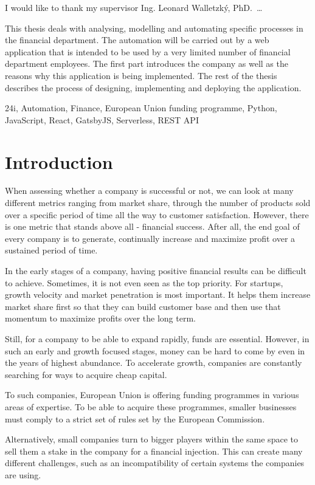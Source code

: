 \documentclass[12pt,oneside]{fithesis2}
\begin{document}
  \FrontMatter
    \ThesisTitlePage
    \begin{ThesisDeclaration}
      \DeclarationText
      \AdvisorName
    \end{ThesisDeclaration}
    \begin{ThesisThanks}
      I would like to thank my supervisor Ing. Leonard Walletzký, PhD. \,\dots
    \end{ThesisThanks}
    \begin{ThesisAbstract}
      This thesis deals with analysing, modelling and automating specific processes in the financial department. The automation will be carried out by a web application that is intended to be used by a very limited number of financial department employees. The first part introduces the company as well as the reasons why this application is being implemented. The rest of the thesis describes the process of designing, implementing and deploying the application.
    \end{ThesisAbstract}
    \begin{ThesisKeyWords}
      24i, Automation, Finance, European Union funding programme, Python, JavaScript, React, GatsbyJS, Serverless, REST API
    \end{ThesisKeyWords}
    \tableofcontents
  
  \MainMatter
    \chapter{Introduction}
    When assessing whether a company is successful or not, we can look at many different metrics ranging from market share, through the number of products sold over a specific period of time all the way to customer satisfaction. However, there is one metric that stands above all  - financial success. After all, the end goal of every company is to generate, continually increase and maximize profit over a sustained period of time.
    \par
    In the early stages of a company, having positive financial results can be difficult to achieve. Sometimes, it is not even seen as the top priority. For startups, growth velocity and market penetration is most important. It helps them increase market share first so that they can build customer base and then use that momentum to maximize profits over the long term.
    \par
    Still, for a company to be able to expand rapidly, funds are essential. However, in such an early and growth focused stages, money can be hard to come by even in the years of highest abundance. To accelerate growth, companies are constantly searching for ways to acquire cheap capital.
    \par
    To such companies, European Union is offering funding programmes in various areas of expertise. To be able to acquire these programmes, smaller businesses must comply to a strict set of rules set by the European Commission.
    \par
    Alternatively, small companies turn to bigger players within the same space to sell them a stake in the company for a financial injection. This can create many different challenges, such as an incompatibility of certain systems the companies are using.
    \newpage
\end{document}
